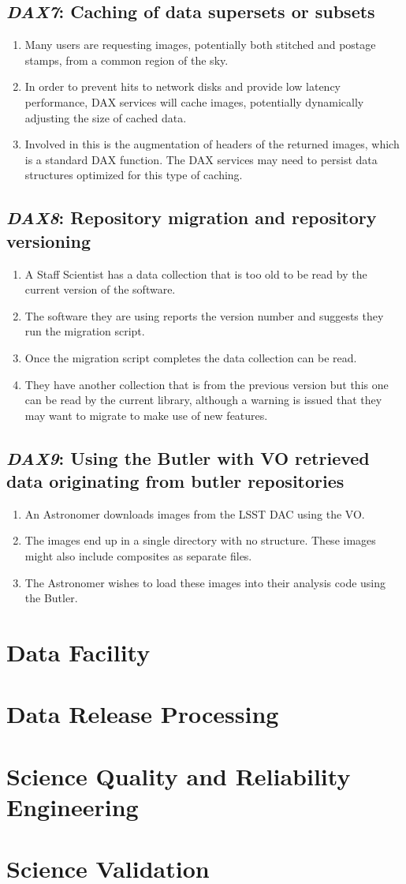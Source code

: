 \documentclass[DM,toc,lsstdraft]{lsstdoc}
\newcommand{\usecase}[3]{%
\subsection{\emph{#1}: #2}
\begin{enumerate}[label=\alph*.]
#3
\end{enumerate}
}
\begin{document}
\usecase{DAX7}{Caching of data supersets or subsets}{%

\item
Many users are requesting images, potentially both stitched and postage stamps, from a common region of the sky.

\item
In order to prevent hits to network disks and provide low latency performance, DAX services will cache images, potentially dynamically adjusting the size of cached data.

\item
Involved in this is the augmentation of headers of the returned images, which is a standard DAX function.
The DAX services may need to persist data structures optimized for this type of caching.

}

\usecase{DAX8}{Repository migration and repository versioning}{%

\item
A Staff Scientist has a data collection that is too old to be read by the current version of the software.

\item
The software they are using reports the version number and suggests they run the migration script.

\item
Once the migration script completes the data collection can be read.

\item
They have another collection that is from the previous version but this one can be read by the current library, although a warning is issued that they may want to migrate to make use of new features.

}

\usecase{DAX9}{Using the Butler with VO retrieved data originating from butler repositories}{%

\item
An Astronomer downloads images from the LSST DAC using the VO.

\item
The images end up in a single directory with no structure.
These images might also include composites as separate files.

\item
The Astronomer wishes to load these images into their analysis code using the Butler.

}

\section{Data Facility}



\section{Data Release Processing}

\section{Science Quality and Reliability Engineering}

\section{Science Validation}





\end{document}
